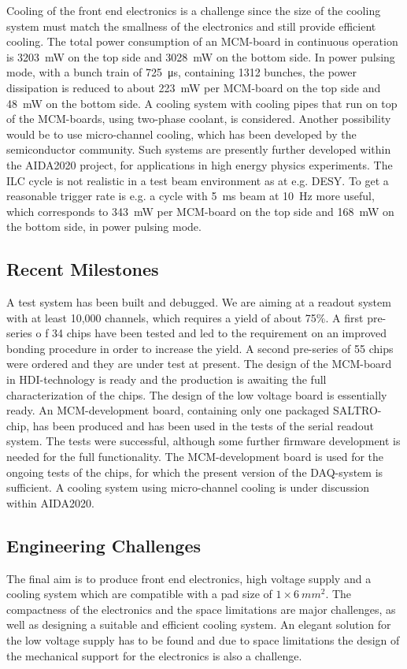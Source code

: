 Cooling of the front end electronics is a challenge since the size of the cooling system must match the smallness of the electronics and still provide efficient cooling. The total power consumption of an MCM-board in continuous operation
is \SI{3203}{mW} on the top side and \SI{3028}{mW} on the bottom side. In power pulsing mode, with a bunch train of \SI{725}{\micro s}, containing 1312 bunches, the power dissipation is reduced to about \SI{223}{mW} per MCM-board on the top side and \SI{48}{mW} on the bottom side. A cooling system with cooling pipes that run on top of the MCM-boards, using two-phase  coolant, is considered. Another possibility would be to use micro-channel cooling, which has been developed by the semiconductor community. Such systems are presently further developed within the AIDA2020 project, for applications in high energy physics experiments. The ILC cycle is not realistic in a test beam environment as at e.g. DESY. To get a reasonable trigger rate is e.g. a cycle with \SI{5}{ms} beam at \SI{10}{Hz} more useful, which corresponds to \SI{343}{mW} per MCM-board on the top side and \SI{168}{mW} on the bottom side, in power pulsing mode.

\subsection{Recent Milestones}
A test system has been built and debugged. We are aiming at a readout system with at least 10,000 channels, which requires a yield of about 75\%. A first pre-series o f 34 chips have been tested and led to the requirement on an improved bonding procedure in order to increase the yield. A second pre-series of 55 chips were ordered and they are under test at present. The design of the MCM-board in HDI-technology is ready and the production is awaiting the full characterization of the chips. The design of the low voltage board is essentially ready. An MCM-development board, containing only one packaged SALTRO-chip, has been produced and has been used in the tests of the serial readout system. The tests were successful, although some further firmware development is needed for the full functionality. The MCM-development board is used for the ongoing tests of the chips, for which the present version of the DAQ-system is sufficient. A cooling system using micro-channel cooling is under discussion within AIDA2020.

\subsection{Engineering Challenges}
The final aim is to produce front end electronics, high voltage supply and a cooling system which are compatible with a pad size of $1 \times \SI{6}{mm^2}$. The compactness of the electronics and the space limitations are major challenges, as well as designing a suitable and efficient cooling system. An elegant solution for the low voltage supply has to be found and due to space limitations the design of the mechanical support for the electronics is also a challenge.

